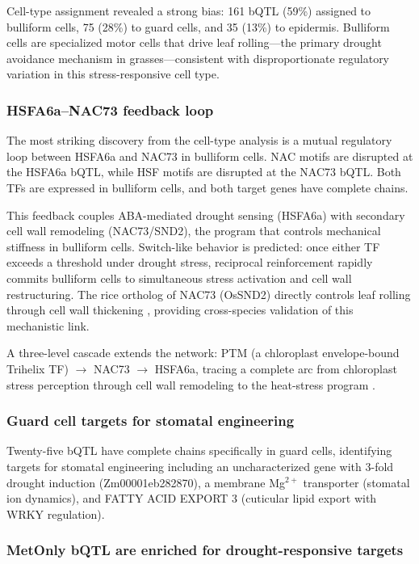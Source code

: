 \documentclass[11pt,a4paper]{article}
\begin{document}
Cell-type assignment revealed a strong bias: 161 bQTL (59\%) assigned to bulliform cells, 75 (28\%) to guard cells, and 35 (13\%) to epidermis. Bulliform cells are specialized motor cells that drive leaf rolling---the primary drought avoidance mechanism in grasses---consistent with disproportionate regulatory variation in this stress-responsive cell type.

\subsubsection{HSFA6a--NAC73 feedback loop}

The most striking discovery from the cell-type analysis is a mutual regulatory loop between HSFA6a and NAC73 in bulliform cells. NAC motifs are disrupted at the HSFA6a bQTL, while HSF motifs are disrupted at the NAC73 bQTL. Both TFs are expressed in bulliform cells, and both target genes have complete chains.

This feedback couples ABA-mediated drought sensing (HSFA6a) with secondary cell wall remodeling (NAC73/SND2), the program that controls mechanical stiffness in bulliform cells. Switch-like behavior is predicted: once either TF exceeds a threshold under drought stress, reciprocal reinforcement rapidly commits bulliform cells to simultaneous stress activation and cell wall restructuring. The rice ortholog of NAC73 (OsSND2) directly controls leaf rolling through cell wall thickening \citep{ye2018}, providing cross-species validation of this mechanistic link.

A three-level cascade extends the network: PTM (a chloroplast envelope-bound Trihelix TF) $\rightarrow$ NAC73 $\rightarrow$ HSFA6a, tracing a complete arc from chloroplast stress perception through cell wall remodeling to the heat-stress program \citep{sun2011}.

\subsubsection{Guard cell targets for stomatal engineering}

Twenty-five bQTL have complete chains specifically in guard cells, identifying targets for stomatal engineering including an uncharacterized gene with 3-fold drought induction (Zm00001eb282870), a membrane Mg$^{2+}$ transporter (stomatal ion dynamics), and FATTY ACID EXPORT 3 (cuticular lipid export with WRKY regulation).

\subsubsection{MetOnly bQTL are enriched for drought-responsive targets}
\end{document}
